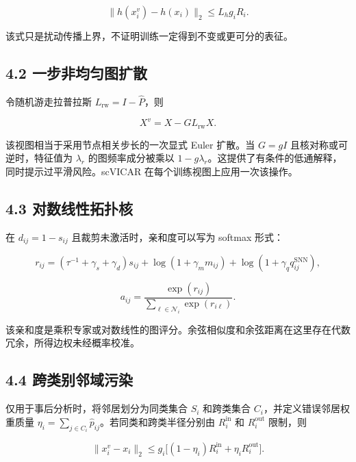 \documentclass[journal]{IEEEtran}
\begin{document}
\begin{equation}
\|h(x_i^v)-h(x_i)\|_2\le L_hg_iR_i.
\end{equation}

该式只是扰动传播上界，不证明训练一定得到不变或更可分的表征。

\subsection{4.2 一步非均匀图扩散}

令随机游走拉普拉斯 $L_{\mathrm{rw}}=I-\widehat P$，则

\begin{equation}
X^v=X-GL_{\mathrm{rw}}X.
\end{equation}

该视图相当于采用节点相关步长的一次显式 Euler 扩散。当 $G=gI$ 且核对称或可逆时，特征值为 $\lambda_r$ 的图频率成分被乘以 $1-g\lambda_r$。这提供了有条件的低通解释，同时提示过平滑风险。scVICAR 在每个训练视图上应用一次该操作。

\subsection{4.3 对数线性拓扑核}

在 $d_{ij}=1-s_{ij}$ 且裁剪未激活时，亲和度可以写为 softmax 形式：

\begin{equation}
r_{ij}=(\tau^{-1}+\gamma_s+\gamma_d)s_{ij}
+\log(1+\gamma_m m_{ij})+\log(1+\gamma_q q_{ij}^{\mathrm{SNN}}),
\end{equation}

\begin{equation}
a_{ij}=\frac{\exp(r_{ij})}{\sum_{\ell\in\mathcal N_i}\exp(r_{i\ell})}.
\end{equation}

该亲和度是乘积专家或对数线性的图评分。余弦相似度和余弦距离在这里存在代数冗余，所得边权未经概率校准。

\subsection{4.4 跨类别邻域污染}

仅用于事后分析时，将邻居划分为同类集合 $S_i$ 和跨类集合 $C_i$，并定义错误邻居权重质量 $\eta_i=\sum_{j\in C_i}\widehat p_{ij}$。若同类和跨类半径分别由 $R_i^{\mathrm{in}}$ 和 $R_i^{\mathrm{out}}$ 限制，则

\begin{equation}
\|x_i^v-x_i\|_2\le g_i\bigl[(1-\eta_i)R_i^{\mathrm{in}}+\eta_iR_i^{\mathrm{out}}\bigr].
\end{equation}
\end{document}
